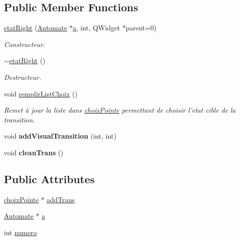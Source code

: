 \subsection*{Public Member Functions}
\begin{DoxyCompactItemize}
\item 
\hyperlink{classetat_right_a9f171541e1762e55588f569a6c168dd3}{etat\-Right} (\hyperlink{class_automate}{Automate} $\ast$\hyperlink{classetat_right_aa6d344e0bd745915bfb4ea0e767f0bc0}{a}, int, Q\-Widget $\ast$parent=0)
\begin{DoxyCompactList}\small\item\em Constructeur. \end{DoxyCompactList}\item 
\hypertarget{classetat_right_a3e242d2baf785c43643f0bf9d8dec58f}{\hyperlink{classetat_right_a3e242d2baf785c43643f0bf9d8dec58f}{$\sim$etat\-Right} ()}\label{classetat_right_a3e242d2baf785c43643f0bf9d8dec58f}

\begin{DoxyCompactList}\small\item\em Destructeur. \end{DoxyCompactList}\item 
\hypertarget{classetat_right_a6631d8b4878cdaa7c8443c24825fd791}{void \hyperlink{classetat_right_a6631d8b4878cdaa7c8443c24825fd791}{remplir\-List\-Choix} ()}\label{classetat_right_a6631d8b4878cdaa7c8443c24825fd791}

\begin{DoxyCompactList}\small\item\em Remet à jour la liste dans \hyperlink{classchoix_pointe}{choix\-Pointe} permettant de choisir l'etat cible de la transition. \end{DoxyCompactList}\item 
\hypertarget{classetat_right_a9bd49810066fc43059d2adf138784fd6}{void {\bfseries add\-Visual\-Transition} (int, int)}\label{classetat_right_a9bd49810066fc43059d2adf138784fd6}

\item 
\hypertarget{classetat_right_a181683fbe813964220ddde7a048d840c}{void {\bfseries clean\-Trans} ()}\label{classetat_right_a181683fbe813964220ddde7a048d840c}

\end{DoxyCompactItemize}
\subsection*{Public Attributes}
\begin{DoxyCompactItemize}
\item 
\hyperlink{classchoix_pointe}{choix\-Pointe} $\ast$ \hyperlink{classetat_right_a1a3bbd118e907a6b9fe76ac22c702006}{add\-Trans}
\item 
\hyperlink{class_automate}{Automate} $\ast$ \hyperlink{classetat_right_aa6d344e0bd745915bfb4ea0e767f0bc0}{a}
\item 
int \hyperlink{classetat_right_ab061da0425585fa691f3766e3e81708c}{numero}
\end{DoxyCompactItemize}
